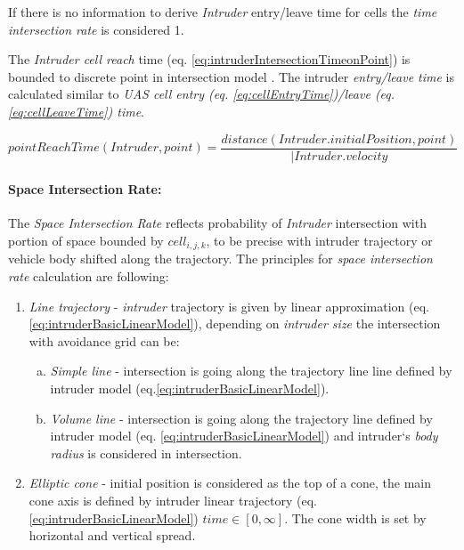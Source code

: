 \begin{note}
    If there is no information to derive \emph{Intruder} entry/leave time for cells the \emph{time intersection rate} is considered 1.
\end{note}

The \emph{Intruder cell reach} time (eq. \ref{eq:intruderIntersectionTimeonPoint}) is bounded to discrete point in intersection model \cite{shamos1975closest,bentley1980optimal}. The intruder \emph{entry/leave time} is calculated similar to \emph{UAS cell entry (eq. \ref{eq:cellEntryTime})/leave (eq. \ref{eq:cellLeaveTime}) time}.

\begin{equation}\label{eq:intruderIntersectionTimeonPoint}
    point Reach Time(Intruder,point) = \frac{distance(Intruder.initial Position, point)}{|Intruder.velocity}
\end{equation}


\paragraph{Space Intersection Rate:} The \emph{Space Intersection Rate} reflects probability of \emph{Intruder} intersection with portion of space bounded by $cell_{i,j,k}$, to be precise with intruder trajectory or vehicle body shifted along the trajectory. The principles for \emph{space intersection rate} calculation are following:




\begin{enumerate}
    \item \textit{Line trajectory} - \emph{intruder} trajectory is given by linear approximation (eq. \ref{eq:intruderBasicLinearModel}), depending on \emph{intruder size} the intersection with avoidance grid can be:
    
    \begin{enumerate}[a.]
        \item \emph{Simple line} - intersection is going along the trajectory line line defined by intruder model (eq.\ref{eq:intruderBasicLinearModel}).
    
        \item \emph{Volume line} - intersection is going along the trajectory line defined by intruder model (eq. \ref{eq:intruderBasicLinearModel}) and intruder`s \emph{body radius} is considered in intersection.
    \end{enumerate}
    
    \item \emph{Elliptic cone} - initial position is considered as the top of a cone, the main cone axis is defined by intruder linear trajectory (eq. \ref{eq:intruderBasicLinearModel}) $time \in [0,\infty]$. The cone width is set by horizontal and vertical spread.
\end{enumerate}
